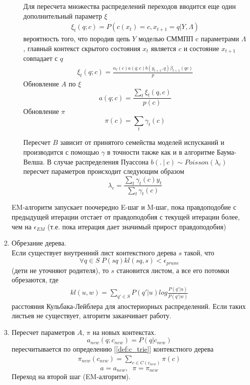\documentclass{matmex-diploma-custom}
\begin{document}
\begin{enumerate}
\begin{enumerate}
Для пересчета множества распределений переходов вводится еще один дополнительный параметр $\xi$
\begin{align*}
\xi_{t}(q;c) = P(c(x_{t})=c, x_{t+1} = q| Y, \Lambda)
\end{align*}
вероятность того, что породив цепь $Y$ моделью СММПП c параметрами $\Lambda$, 
главный контекст скрытого состояния $ x_{t} $ является $c$ и состояние $ x_{t+1} $ совпадает с $q$
\begin{align*}
\xi_{t}(q;c) = \frac{\alpha_{t}(c)a(q;c)b(y_{t+1},q)\beta_{t+1}(qc)}{p} 
\end{align*}
Обновление $ A $ по $ \xi $\\
$$ a(q; c) = \frac{\sum_{t}\xi_{t}(q,c)}{p(c)}$$
Обновление $\pi$
$$\pi(c) = \sum_{t}\gamma_{t}(c)$$

Пересчет $ B $ зависит от принятого семейства моделей испусканий и производится с помощью $ \gamma $ в точности также как и в алгоритме Баума-Велша.
В случае распределения Пуассона
$b(.~|~c) \sim Poisson(\lambda_{c})$ 
пересчет параметров происходит следующим образом
$$ \lambda_{c} = \frac{\sum_{t}{\gamma_{t}(c)y_{t}}}{\sum_{t}{\gamma_{t}(c)}}$$
\end{enumerate}
EM-алгоритм запускает поочередно E-шаг и M-шаг, пока правдоподобие с предыдущей итерации отстает от правдоподобия с текущей итерации более, чем на $ \epsilon_{\textit{EM}}$
(т.е. пока итерация дает значимый прирост правдоподобия)
\item Обрезание дерева.\\
Если существует внутренний лист контекстного дерева $ s $ такой, что 
$$ \forall q \in S \; P(sq)kl(sq, s) < \epsilon_{\textit{prune}} $$
(дети не уточняют родителя), то $ s $ становится листом, а все его потомки обрезаются, где
\begin{align*}
kl(u, w) = \sum_{q' \in S} P(q'|u) log\frac{P(q'|u)}{P(q'|w)}
\end{align*}
расстояния Кульбака-Лейблера для апостериорных распределений.
Если таких листьев не существует, алгоритм заканчивает работу.
\item Пересчет параметров $ A $, $\pi$ на новых контекстах.
$$a_{\textit{new}}(q; c_{\textit{new}}) = P(q| c_{\textit{new}})$$
пересчитывается по определению [\ref{def:c_trie}] контекстного дерева
\begin{align*}
\pi_{\textit{new}}(c_{\textit{new}}) = \sum_{c \in C(c_{\textit{new}})}{\pi(c)}
\end{align*}
$$
a = a_{\textit{new}},\;\;
\pi = \pi_{\textit{new}}
$$
Переход на второй шаг (EM-алгоритм).

\end{enumerate}
\end{document}
